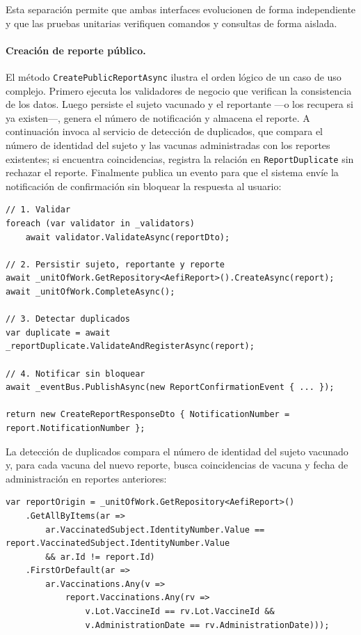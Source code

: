 Esta separación permite que ambas interfaces evolucionen de forma independiente y que las pruebas unitarias verifiquen comandos y consultas de forma aislada.

\paragraph{Creación de reporte público.}

El método \texttt{CreatePublicReportAsync} ilustra el orden lógico de un caso de uso complejo. 
Primero ejecuta los validadores de negocio que verifican la consistencia de los datos. 
Luego persiste el sujeto vacunado y el reportante —o los recupera si ya existen—, genera el número de notificación y almacena el reporte. 
A continuación invoca al servicio de detección de duplicados, que compara el número de identidad del sujeto y las vacunas administradas con los reportes existentes; si encuentra coincidencias, registra la relación en \texttt{ReportDuplicate} sin rechazar el reporte. 
Finalmente publica un evento para que el sistema envíe la notificación de confirmación sin bloquear la respuesta al usuario:

\begin{lstlisting}[language={[Sharp]C}, caption={Flujo principal de creación de reporte}, label={lst:create_report_flow}]
// 1. Validar
foreach (var validator in _validators)
    await validator.ValidateAsync(reportDto);

// 2. Persistir sujeto, reportante y reporte
await _unitOfWork.GetRepository<AefiReport>().CreateAsync(report);
await _unitOfWork.CompleteAsync();

// 3. Detectar duplicados
var duplicate = await _reportDuplicate.ValidateAndRegisterAsync(report);

// 4. Notificar sin bloquear
await _eventBus.PublishAsync(new ReportConfirmationEvent { ... });

return new CreateReportResponseDto { NotificationNumber = report.NotificationNumber };
\end{lstlisting}

La detección de duplicados compara el número de identidad del sujeto vacunado y, para cada vacuna del nuevo reporte, busca coincidencias de vacuna y fecha de administración en reportes anteriores:

\begin{lstlisting}[language={[Sharp]C}, caption={Consulta de detección de duplicados}, label={lst:duplicate_query}]
var reportOrigin = _unitOfWork.GetRepository<AefiReport>()
    .GetAllByItems(ar =>
        ar.VaccinatedSubject.IdentityNumber.Value == report.VaccinatedSubject.IdentityNumber.Value
        && ar.Id != report.Id)
    .FirstOrDefault(ar =>
        ar.Vaccinations.Any(v =>
            report.Vaccinations.Any(rv =>
                v.Lot.VaccineId == rv.Lot.VaccineId &&
                v.AdministrationDate == rv.AdministrationDate)));
\end{lstlisting}

